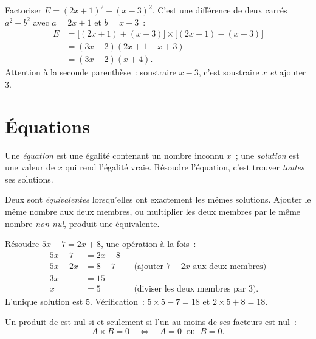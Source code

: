\begin{example}\label{ex:g10:algebra:factorsteps}
Factoriser $E = (2x + 1)^2 - (x - 3)^2$. C'est une différence de deux
carrés $a^2 - b^2$ avec $a = 2x+1$ et $b = x-3$~:
\begin{align*}
E &= \bigl[(2x+1) + (x-3)\bigr] \times \bigl[(2x+1) - (x-3)\bigr] \\
  &= (3x - 2)(2x + 1 - x + 3) \\
  &= (3x - 2)(x + 4).
\end{align*}
Attention à la seconde parenthèse~: soustraire $x - 3$, c'est soustraire
$x$ \emph{et} ajouter $3$.
\end{example}

\section{Équations}

\begin{definition}\label{def:g10:algebra:equation}
Une \emph{équation} est une égalité contenant un nombre
inconnu $x$~; une \emph{solution} est une valeur de $x$ qui rend l'égalité
vraie. Résoudre l'équation, c'est trouver \emph{toutes} ses solutions.
\end{definition}

Deux  sont \emph{équivalentes} lorsqu'elles ont exactement les
mêmes solutions. Ajouter le même nombre aux deux membres, ou multiplier
les deux membres par le même nombre \emph{non nul}, produit une 
équivalente.

\begin{example}\label{ex:g10:algebra:firstdegree}
Résoudre $5x - 7 = 2x + 8$, une opération à la fois~:
\begin{align*}
5x - 7 &= 2x + 8 \\
5x - 2x &= 8 + 7 && \text{(ajouter $7 - 2x$ aux deux membres)} \\
3x &= 15 \\
x &= 5 && \text{(diviser les deux membres par $3$).}
\end{align*}
L'unique solution est $5$. Vérification~: $5 \times 5 - 7 = 18$ et
$2 \times 5 + 8 = 18$.
\end{example}

\begin{theorem}\label{thm:g10:algebra:zeroproduct}
Un produit de  est nul si et seulement si l'un au moins de
ses facteurs est nul~:
\[
A \times B = 0
\quad\Longleftrightarrow\quad
A = 0 \ \text{ ou } \ B = 0 .
\]
\end{theorem}

